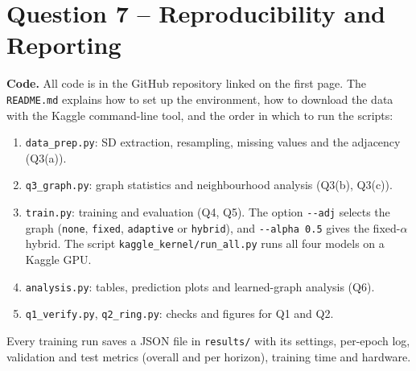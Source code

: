 \documentclass[11pt, a4paper]{article}
\begin{document}
\section*{Question 7 -- Reproducibility and Reporting}

\textbf{Code.} All code is in the GitHub repository linked on the first page. The \texttt{README.md} explains how to set up the environment, how to download the data with the Kaggle command-line tool, and the order in which to run the scripts:
\begin{enumerate}
\item \texttt{data\_prep.py}: SD extraction, resampling, missing values and the adjacency (Q3(a)).
\item \texttt{q3\_graph.py}: graph statistics and neighbourhood analysis (Q3(b), Q3(c)).
\item \texttt{train.py}: training and evaluation (Q4, Q5). The option \texttt{-{}-adj} selects the graph (\texttt{none}, \texttt{fixed}, \texttt{adaptive} or \texttt{hybrid}), and \texttt{-{}-alpha 0.5} gives the fixed-$\alpha$ hybrid. The script \texttt{kaggle\_\allowbreak kernel/\allowbreak run\_\allowbreak all.py} runs all four models on a Kaggle GPU.
\item \texttt{analysis.py}: tables, prediction plots and learned-graph analysis (Q6).
\item \texttt{q1\_verify.py}, \texttt{q2\_ring.py}: checks and figures for Q1 and Q2.
\end{enumerate}
Every training run saves a JSON file in \texttt{results/} with its settings, per-epoch log, validation and test metrics (overall and per horizon), training time and hardware.
\end{document}
